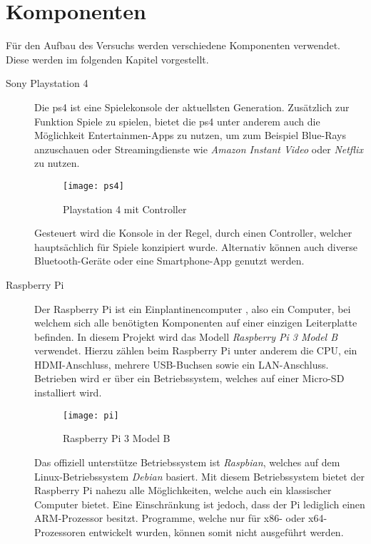 \newpage
\section{Komponenten}\label{sec:komponenten}
Für den Aufbau des Versuchs werden verschiedene Komponenten verwendet.
Diese werden im folgenden Kapitel vorgestellt.

\begin{description}
    \item[Sony Playstation 4 \cite{PS4Welco38:online}]
        Die \ac{ps4} ist eine Spielekonsole der aktuellsten Generation.
        Zusätzlich zur Funktion Spiele zu spielen, bietet die \ac{ps4}
        unter anderem auch die Möglichkeit Entertainmen-Apps zu nutzen, um zum Beispiel Blue-Rays anzuschauen
        oder Streamingdienste wie \textit{Amazon Instant Video} oder \textit{Netflix} zu nutzen.

        \begin{figure}[h!]
            \centering
            \texttt{[image: ps4]}
            \caption{Playstation 4 mit Controller}\label{fig:ps4}
        \end{figure}

        Gesteuert wird die Konsole in der Regel, durch einen Controller, welcher hauptsächlich für Spiele konzipiert wurde.
        Alternativ können auch diverse Bluetooth-Geräte oder eine Smartphone-App genutzt werden.

    \item[Raspberry Pi \cite{Whatisth47:online}]
        Der Raspberry Pi ist ein Einplantinencomputer \cite{Einplati37:online}, also ein Computer,
        bei welchem sich alle benötigten Komponenten auf einer einzigen Leiterplatte befinden.
        In diesem Projekt wird das Modell \textit{Raspberry Pi 3 Model B} verwendet.
        Hierzu zählen beim Raspberry Pi unter anderem die CPU, ein HDMI-Anschluss, mehrere USB-Buchsen sowie ein LAN-Anschluss.
        Betrieben wird er über ein Betriebssystem, welches auf einer Micro-SD installiert wird.

        \begin{figure}[h!]
            \centering
            \texttt{[image: pi]}
            \caption{Raspberry Pi 3 Model B \cite{Raspberr2:online}}\label{fig:pi}
        \end{figure}

        Das offiziell unterstütze Betriebssystem ist \textit{Raspbian}, welches auf dem Linux-Betriebssystem \textit{Debian} basiert.
        Mit diesem Betriebssystem bietet der Raspberry Pi nahezu alle Möglichkeiten, welche auch ein klassischer Computer bietet.
        Eine Einschränkung ist jedoch, dass der Pi lediglich einen ARM-Prozessor besitzt.
        Programme, welche nur für x86- oder x64-Prozessoren entwickelt wurden, können somit nicht ausgeführt werden.


\end{description}

